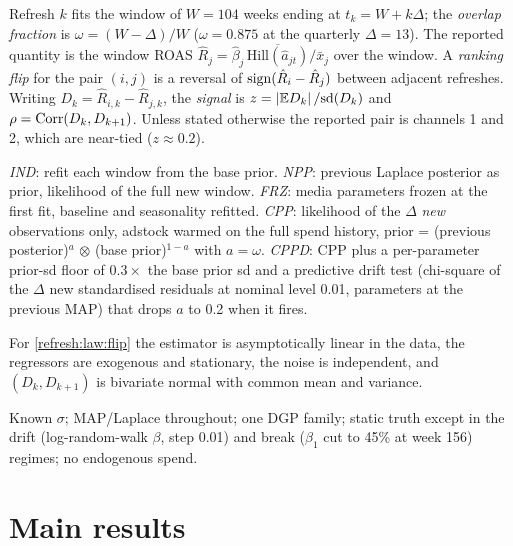 \begin{definition}
\label{refresh:def:refresh}
Refresh $k$ fits the window of $W = 104$ weeks ending at $t_k = W + k\Delta$; the \emph{overlap fraction} is $\omega = (W - \Delta)/W$ ($\omega = 0.875$ at the quarterly $\Delta = 13$). The reported quantity is the window ROAS $\hat R_j = \hat\beta_j\,\overline{\mathrm{Hill}(\hat a_{jt})}/\bar x_j$ over the window. A \emph{ranking flip} for the pair $(i, j)$ is a reversal of $\operatorname{sign}(\hat R_i - \hat R_j)$ between adjacent refreshes. Writing $D_k = \hat R_{i,k} - \hat R_{j,k}$, the \emph{signal} is $z = \left|\mathbb{E} D_k\right|/\mathrm{sd}(D_k)$ and $\rho = \operatorname{Corr}(D_k, D_{k+1})$. Unless stated otherwise the reported pair is channels 1 and 2, which are near-tied ($z \approx 0.2$).
\end{definition}

\begin{definition}
\label{refresh:def:schemes}
\emph{IND}: refit each window from the base prior. \emph{NPP}: previous Laplace posterior as prior, likelihood of the full new window. \emph{FRZ}: media parameters frozen at the first fit, baseline and seasonality refitted. \emph{CPP}: likelihood of the $\Delta$ \emph{new} observations only, adstock warmed on the full spend history, prior = (previous posterior)$^{a}$ $\otimes$ (base prior)$^{1-a}$ with $a = \omega$. \emph{CPPD}: CPP plus a per-parameter prior-sd floor of $0.3\times$ the base prior sd and a predictive drift test (chi-square of the $\Delta$ new standardised residuals at nominal level 0.01, parameters at the previous MAP) that drops $a$ to 0.2 when it fires.
\end{definition}

\begin{assumption}
\label{refresh:ass:linear}
For \cref{refresh:law:flip} the estimator is asymptotically linear in the data, the regressors are exogenous and stationary, the noise is independent, and $(D_k, D_{k+1})$ is bivariate normal with common mean and variance.
\end{assumption}

\begin{assumption}
\label{refresh:ass:scope}
Known $\sigma$; MAP/Laplace throughout; one DGP family; static truth except in the drift (log-random-walk $\beta$, step 0.01) and break ($\beta_1$ cut to 45\% at week 156) regimes; no endogenous spend.
\end{assumption}

\section{Main results}


